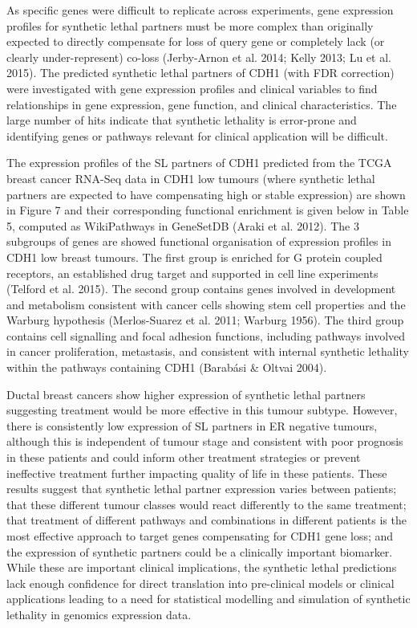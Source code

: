 As specific genes were difficult to replicate across experiments, gene expression profiles for synthetic lethal partners must be more complex than originally expected to directly compensate for loss of query gene or completely lack (or clearly under-represent) co-loss (Jerby-Arnon et al. 2014; Kelly 2013; Lu et al. 2015).  The predicted synthetic lethal partners of CDH1 (with FDR correction) were investigated with gene expression profiles and clinical variables to find relationships in gene expression, gene function, and clinical characteristics.  The large number of hits indicate that synthetic lethality is error-prone and identifying genes or pathways relevant for clinical application will be difficult.

The expression profiles of the SL partners of CDH1 predicted from the TCGA breast cancer RNA-Seq data in CDH1 low tumours (where synthetic lethal partners are expected to have compensating high or stable expression) are shown in Figure 7 and their corresponding functional enrichment is given below in Table 5, computed as WikiPathways in GeneSetDB (Araki et al. 2012).  The 3 subgroups of genes are showed functional organisation of expression profiles in CDH1 low breast tumours.  The first group is enriched for G protein coupled receptors, an established drug target and supported in cell line experiments (Telford et al. 2015).  The second group contains genes involved in development and metabolism consistent with cancer cells showing stem cell properties and the Warburg hypothesis (Merlos-Suarez et al. 2011; Warburg 1956).  The third group contains cell signalling and focal adhesion functions, including pathways involved in cancer proliferation, metastasis, and consistent with internal synthetic lethality within the pathways containing CDH1 (Barabási \& Oltvai 2004).

Ductal breast cancers show higher expression of synthetic lethal partners suggesting treatment would be more effective in this tumour subtype.  However, there is consistently low expression of SL partners in ER negative tumours, although this is independent of tumour stage and consistent with poor prognosis in these patients and could inform other treatment strategies or prevent ineffective treatment further impacting quality of life in these patients.  These results suggest that synthetic lethal partner expression varies between patients; that these different tumour classes would react differently to the same treatment; that treatment of different pathways and combinations in different patients is the most effective approach to target genes compensating for CDH1 gene loss; and the expression of synthetic partners could be a clinically important biomarker.  While these are important clinical implications, the synthetic lethal predictions lack enough confidence for direct translation into pre-clinical models or clinical applications leading to a need for statistical modelling and simulation of synthetic lethality in genomics expression data.